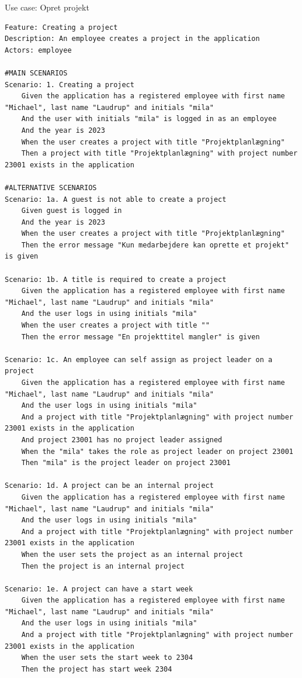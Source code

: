 \begin{listing}[H]
    \centering
    \caption{Use case: Opret projekt}\label{lst:usecase_create_project}
    \begin{verbatim}  
Feature: Creating a project
Description: An employee creates a project in the application
Actors: employee

#MAIN SCENARIOS
Scenario: 1. Creating a project
    Given the application has a registered employee with first name "Michael", last name "Laudrup" and initials "mila"
    And the user with initials "mila" is logged in as an employee
    And the year is 2023
    When the user creates a project with title "Projektplanlægning" 
    Then a project with title "Projektplanlægning" with project number 23001 exists in the application

#ALTERNATIVE SCENARIOS
Scenario: 1a. A guest is not able to create a project
    Given guest is logged in
    And the year is 2023
    When the user creates a project with title "Projektplanlægning" 
    Then the error message "Kun medarbejdere kan oprette et projekt" is given

Scenario: 1b. A title is required to create a project
    Given the application has a registered employee with first name "Michael", last name "Laudrup" and initials "mila"
    And the user logs in using initials "mila"
    When the user creates a project with title ""
    Then the error message "En projekttitel mangler" is given

Scenario: 1c. An employee can self assign as project leader on a project
    Given the application has a registered employee with first name "Michael", last name "Laudrup" and initials "mila"
    And the user logs in using initials "mila"
    And a project with title "Projektplanlægning" with project number 23001 exists in the application
    And project 23001 has no project leader assigned
    When the "mila" takes the role as project leader on project 23001
    Then "mila" is the project leader on project 23001

Scenario: 1d. A project can be an internal project
    Given the application has a registered employee with first name "Michael", last name "Laudrup" and initials "mila"
    And the user logs in using initials "mila"
    And a project with title "Projektplanlægning" with project number 23001 exists in the application
    When the user sets the project as an internal project
    Then the project is an internal project

Scenario: 1e. A project can have a start week
    Given the application has a registered employee with first name "Michael", last name "Laudrup" and initials "mila"
    And the user logs in using initials "mila"
    And a project with title "Projektplanlægning" with project number 23001 exists in the application
    When the user sets the start week to 2304
    Then the project has start week 2304
    \end{verbatim}
\end{listing}
